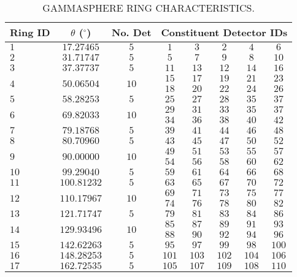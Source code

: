 \begin{table}
\caption{GAMMASPHERE RING CHARACTERISTICS.\label{tbl:app1-gs-rings}}
\begin{center}
\begin{tabular}{lccccccc}
\toprule
Ring ID & $\theta$ ($^{\circ}$) & No. Det&\multicolumn{5}{c}{Constituent Detector IDs}\\
\midrule
$1$&$17.27465$&$5$&$1$&$3$&$2$&$4$&$6$\\
\hline $2$&$31.71747$&$5$&$5$&$7$&$9$&$8$&$10$\\
\hline $3$&$37.37737$&$5$&$11$&$13$&$12$&$14$&$16$\\
\hline \multirow{2}{*}{$4$}&\multirow{2}{*}{$50.06504$}&\multirow{2}{*}{$10$}&$15$&$17$&$19$&$21$&$23$\\
&&&$18$&$20$&$22$&$24$&$26$\\
\hline $5$&$58.28253$&$5$&$25$&$27$&$28$&$35$&$37$\\
\hline \multirow{2}{*}{$6$}&\multirow{2}{*}{$69.82033$}&\multirow{2}{*}{$10$}&$29$&$31$&$33$&$35$&$37$\\
&&&$34$&$36$&$38$&$40$&$42$\\
\hline $7$&$79.18768$&$5$&$39$&$41$&$44$&$46$&$48$\\
\hline $8$&$80.70960$&$5$&$43$&$45$&$47$&$50$&$52$\\
\hline \multirow{2}{*}{$9$}&\multirow{2}{*}{$90.00000$}&\multirow{2}{*}{$10$}&$49$&$51$&$53$&$55$&$57$ \\
&&&$54$&$56$&$58$&$60$&$62$\\
\hline $10$&$99.29040$&$5$&$59$&$61$&$64$&$66$&$68$\\
\hline $11$&$100.81232$&$5$&$63$&$65$&$67$&$70$&$72$\\
\hline \multirow{2}{*}{$12$}&\multirow{2}{*}{$110.17967$}&\multirow{2}{*}{$10$}&$69$&$71$&$73$&$75$&$77$\\
&&&$74$&$76$&$78$&$80$&$82$\\
\hline $13$&$121.71747$&$5$&$79$&$81$&$83$&$84$&$86$\\
\hline \multirow{2}{*}{$14$}&\multirow{2}{*}{$129.93496$}&\multirow{2}{*}{$10$}&$85$&$87$&$89$&$91$&$93$\\
&&&$88$&$90$&$92$&$94$&$96$\\
\hline $15$&$142.62263$&$5$&$95$&$97$&$99$&$98$&$100$\\
\hline $16$&$148.28253$&$5$&$101$&$103$&$102$&$104$&$106$\\
\hline $17$&$162.72535$&$5$&$105$&$107$&$109$&$108$&$110$\\
\bottomrule
\end{tabular}
\end{center}
\end{table}

